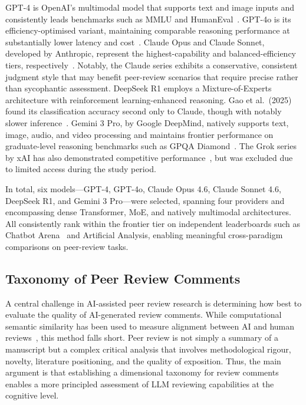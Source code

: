 \documentclass[preprint,10pt,times]{elsarticle}
\begin{document}
GPT-4 is OpenAI's multimodal model that supports text and image inputs and consistently leads benchmarks such as MMLU and HumanEval~\cite{ref14}. GPT-4o is its efficiency-optimised variant, maintaining comparable reasoning performance at substantially lower latency and cost~\cite{ref15}. Claude Opus and Claude Sonnet, developed by Anthropic, represent the highest-capability and balanced-efficiency tiers, respectively~\cite{ref16}. Notably, the Claude series exhibits a conservative, consistent judgment style that may benefit peer-review scenarios that require precise rather than sycophantic assessment. DeepSeek R1 employs a Mixture-of-Experts architecture with reinforcement learning-enhanced reasoning. Gao et al.\ (2025) found its classification accuracy second only to Claude, though with notably slower inference~\cite{ref17}. Gemini 3 Pro, by Google DeepMind, natively supports text, image, audio, and video processing and maintains frontier performance on graduate-level reasoning benchmarks such as GPQA Diamond~\cite{ref18}. The Grok series by xAI has also demonstrated competitive performance~\cite{ref19}, but was excluded due to limited access during the study period.

In total, six models---GPT-4, GPT-4o, Claude Opus 4.6, Claude Sonnet 4.6, DeepSeek R1, and Gemini 3 Pro---were selected, spanning four providers and encompassing dense Transformer, MoE, and natively multimodal architectures. All consistently rank within the frontier tier on independent leaderboards such as Chatbot Arena~\cite{ref20} and Artificial Analysis, enabling meaningful cross-paradigm comparisons on peer-review tasks.

\subsection{Taxonomy of Peer Review Comments}
\label{sec:taxonomy}

A central challenge in AI-assisted peer review research is determining how best to evaluate the quality of AI-generated review comments. While computational semantic similarity has been used to measure alignment between AI and human reviews~\cite{ref21}, this method falls short. Peer review is not simply a summary of a manuscript but a complex critical analysis that involves methodological rigour, novelty, literature positioning, and the quality of exposition. Thus, the main argument is that establishing a dimensional taxonomy for review comments enables a more principled assessment of LLM reviewing capabilities at the cognitive level.
\end{document}

